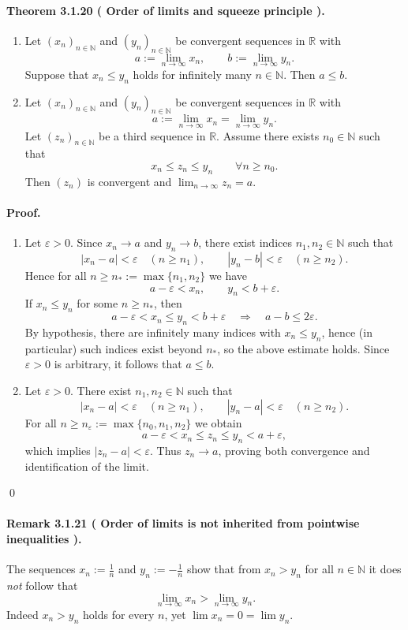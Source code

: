 \documentclass[12pt]{article}
\newcommand{\N}{\mathbb{N}}
\newcommand{\R}{\mathbb{R}}
\newcommand{\eps}{\varepsilon}
\newcommand{\NumberedTheorem}[3]{%
\paragraph*{Theorem #1 ( #2 ).} #3\par}
\newcommand{\NumberedRemark}[3]{%
\paragraph*{Remark #1 ( #2 ).} #3\par}
\begin{document}
\NumberedTheorem{3.1.20}{Order of limits and squeeze principle}{
\begin{enumerate}[label={(\arabic*)}, leftmargin=*]
	\item Let $(x_n)_{n\in\N}$ and $(y_n)_{n\in\N}$ be convergent sequences in $\R$ with
	\[
		a := \lim_{n\to\infty} x_n,\qquad b := \lim_{n\to\infty} y_n.
	\]
	Suppose that $x_n\le y_n$ holds for infinitely many $n\in\N$. Then $a\le b$.

	\item Let $(x_n)_{n\in\N}$ and $(y_n)_{n\in\N}$ be convergent sequences in $\R$ with
	\[
		a := \lim_{n\to\infty} x_n = \lim_{n\to\infty} y_n.
	\]
	Let $(z_n)_{n\in\N}$ be a third sequence in $\R$. Assume there exists $n_0\in\N$ such that
	\[
		x_n \le z_n \le y_n \qquad \forall n\ge n_0.
	\]
	Then $(z_n)$ is convergent and $\lim_{n\to\infty} z_n = a$.
\end{enumerate}}

\paragraph{Proof.}
\begin{enumerate}[label={(\arabic*)}, leftmargin=*]
	\item Let $\eps>0$. Since $x_n\to a$ and $y_n\to b$, there exist indices $n_1,n_2\in\N$ such that
	\[
		|x_n-a|<\eps \quad (n\ge n_1), \qquad |y_n-b|<\eps \quad (n\ge n_2).
	\]
	Hence for all $n\ge n_\ast:=\max\{n_1,n_2\}$ we have
	\[
		a-\eps < x_n, \qquad y_n < b+\eps.
	\]
	If $x_n\le y_n$ for some $n\ge n_\ast$, then
	\[
		a-\eps < x_n \le y_n < b+\eps \quad \Longrightarrow \quad a-b \le 2\eps.
	\]
	By hypothesis, there are infinitely many indices with $x_n\le y_n$, hence (in particular) such indices exist beyond $n_\ast$, so the above estimate holds. Since $\eps>0$ is arbitrary, it follows that $a\le b$.

	\item Let $\eps>0$. There exist $n_1,n_2\in\N$ such that
	\[
		|x_n-a|<\eps \quad (n\ge n_1),\qquad |y_n-a|<\eps \quad (n\ge n_2).
	\]
	For all $n\ge n_\eps:=\max\{n_0,n_1,n_2\}$ we obtain
	\[
		a-\eps < x_n \le z_n \le y_n < a+\eps,
	\]
	which implies $|z_n-a|<\eps$. Thus $z_n\to a$, proving both convergence and identification of the limit.
\end{enumerate}
\qed

\NumberedRemark{3.1.21}{Order of limits is not inherited from pointwise inequalities}{The sequences $x_n:=\tfrac{1}{n}$ and $y_n:=-\tfrac{1}{n}$ show that from $x_n>y_n$ for all $n\in\N$ it does \emph{not} follow that
\[
	\lim_{n\to\infty} x_n > \lim_{n\to\infty} y_n.
\]
Indeed $x_n>y_n$ holds for every $n$, yet $\lim x_n = 0 = \lim y_n$.}
\end{document}
